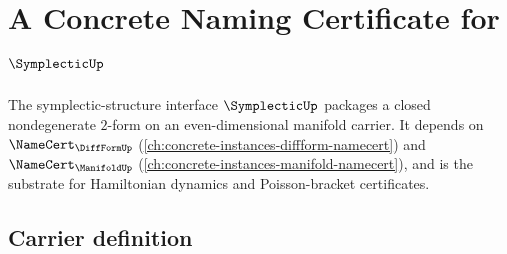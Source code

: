 \chapter{A Concrete Naming Certificate for $\SymplecticUp$}
\label{ch:concrete-instances-symplectic-namecert}

The symplectic-structure interface $\SymplecticUp$ packages a closed nondegenerate $2$-form on an even-dimensional manifold carrier. It depends on $\NameCert_{\DiffFormUp}$ (\autoref{ch:concrete-instances-diffform-namecert}) and $\NameCert_{\ManifoldUp}$ (\autoref{ch:concrete-instances-manifold-namecert}), and is the substrate for Hamiltonian dynamics and Poisson-bracket certificates.

\section{Carrier definition}
\label{sec:symplectic-carrier}

